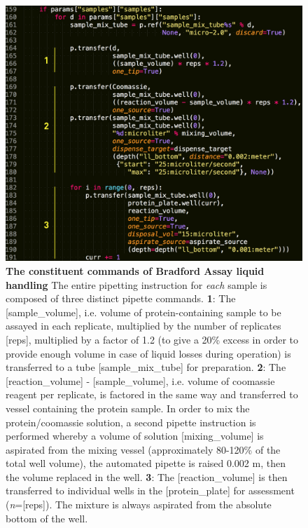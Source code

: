 \documentclass{article}
\begin{document}
\begin{figure}
\centering
\begin{footnotesize}
\includegraphics[scale=0.35]{code}
\caption{\textbf{The constituent commands of Bradford Assay liquid handling} The entire pipetting instruction for \textit{each} sample is composed of three distinct pipette commands. \textbf{1}: The [sample\_volume], i.e. volume of protein-containing sample to be assayed in each replicate, multiplied by the number of replicates [reps], multiplied by a factor of 1.2 (to give a 20\% excess in order to provide enough volume in case of liquid losses during operation) is transferred to a tube [sample\_mix\_tube] for preparation. \textbf{2}: The [reaction\_volume] - [sample\_volume], i.e. volume of coomassie reagent per replicate, is factored in the same way and transferred to vessel containing the protein sample.  In order to mix the protein/coomassie solution, a second pipette instruction is performed whereby a volume of solution [mixing\_volume] is aspirated from the mixing vessel (approximately 80-120\% of the total well volume), the automated pipette is raised 0.002 m, then the volume replaced in the well. \textbf{3}: The [reaction\_volume] is then transferred to individual wells in the [protein\_plate] for assessment (\textit{n}=[reps]).  The mixture is always aspirated from the absolute bottom of the well.}
\label{fig}
\end{footnotesize}
\end{figure}
\end{document}
